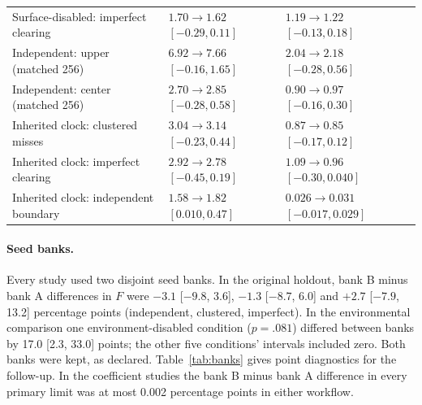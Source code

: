 \documentclass[11pt]{article}
\newcommand{\mn}{\ensuremath{-}}
\begin{document}
{\begin{longtable}{>{\raggedright\arraybackslash}p{.34\linewidth}>{\raggedright\arraybackslash}p{.29\linewidth}>{\raggedright\arraybackslash}p{.29\linewidth}}
Surface-disabled: imperfect clearing & $1.70\to 1.62$\newline $[-0.29, 0.11]$ & $1.19\to 1.22$\newline $[-0.13, 0.18]$\\
Independent: upper (matched 256) & $6.92\to 7.66$\newline $[-0.16, 1.65]$ & $2.04\to 2.18$\newline $[-0.28, 0.56]$\\
Independent: center (matched 256) & $2.70\to 2.85$\newline $[-0.28, 0.58]$ & $0.90\to 0.97$\newline $[-0.16, 0.30]$\\
Inherited clock: clustered misses & $3.04\to 3.14$\newline $[-0.23, 0.44]$ & $0.87\to 0.85$\newline $[-0.17, 0.12]$\\
Inherited clock: imperfect clearing & $2.92\to 2.78$\newline $[-0.45, 0.19]$ & $1.09\to 0.96$\newline $[-0.30, 0.040]$\\
Inherited clock: independent boundary & $1.58\to 1.82$\newline $[0.010, 0.47]$ & $0.026\to 0.031$\newline $[-0.017, 0.029]$\\
\bottomrule\end{longtable}
}

\paragraph{Seed banks.} Every study used two disjoint seed banks. In the original
holdout, bank B minus bank A differences in $F$ were $\mn3.1$ [$\mn9.8$, 3.6],
$\mn1.3$ [$\mn8.7$, 6.0] and $+2.7$ [$\mn7.9$, 13.2] percentage points
(independent, clustered, imperfect). In the environmental comparison one
environment-disabled condition ($p=.081$) differed between banks by 17.0 [2.3,
33.0] points; the other five conditions' intervals included zero. Both banks were
kept, as declared. Table~\ref{tab:banks} gives point diagnostics for the
follow-up. In the coefficient studies the bank B minus bank A difference in every
primary limit was at most 0.002 percentage points in either workflow.
\end{document}
